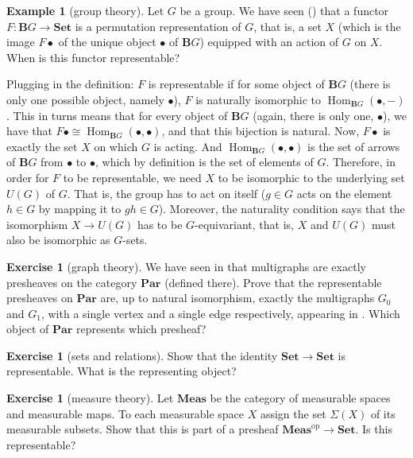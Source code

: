 \documentclass[12pt,oneside,headings=small]{scrbook}
\numberwithin{equation}{section}
\theoremstyle{plain}
\theoremstyle{definition}
\newtheorem{eg}[thm]{Example}
\newtheorem{ex}[thm]{Exercise}
\DeclareMathOperator{\Hom}{Hom}
\newcommand{\cat}[1]{{\mathbf{#1}}} %
\newcommand{\op}{\mathrm{op}} %
\newcommand{\Set}{\cat{Set}}
\DeclareMathOperator{\1}{\mathbbm{1}}
\DeclareMathOperator{\2}{\mathbbm{2}}
\begin{document}
\begin{eg}[group theory]\label{BGrepr}
 Let $G$ be a group. We have seen () that a functor $F:\cat{B}G\to\Set$ is a permutation representation of $G$, that is, a set $X$ (which is the image $F\bullet$ of the unique object $\bullet$ of $\cat{B}G$) equipped with an action of $G$ on $X$. When is this functor representable?
 
 Plugging in the definition: $F$ is representable if for some object of $\cat{B}G$ (there is only one possible object, namely $\bullet$), $F$ is naturally isomorphic to $\Hom_{\cat{B}G}(\bullet, -)$. This in turns means that for every object of $\cat{B}G$ (again, there is only one, $\bullet$), we have that $F\bullet \cong \Hom_{\cat{B}G}(\bullet, \bullet)$, and that this bijection is natural. Now, $F\bullet$ is exactly the set $X$ on which $G$ is acting. And $\Hom_{\cat{B}G}(\bullet, \bullet)$ is the set of arrows of $\cat{B}G$ from $\bullet$ to $\bullet$, which by definition is the set of elements of $G$. Therefore, in order for $F$ to be representable, we need $X$ to be isomorphic to the underlying set $U(G)$ of $G$. That is, the group has to act on itself ($g\in G$ acts on the element $h\in G$ by mapping it to $gh\in G$). Moreover, the naturality condition says that the isomorphism $X\to U(G)$ has to be $G$-equivariant, that is, $X$ and $U(G)$ must also be isomorphic as $G$-sets. 
\end{eg}

\begin{ex}[graph theory]
 We have seen in  that multigraphs are exactly presheaves on the category $\cat{Par}$ (defined there). 
 Prove that the representable presheaves on $\cat{Par}$ are, up to natural isomorphism, exactly the multigraphs $G_0$ and $G_1$, with a single vertex and a single edge respectively, appearing in . Which object of $\cat{Par}$ represents which presheaf?
\end{ex}

\begin{ex}[sets and relations]
 Show that the identity $\Set\to\Set$ is representable. What is the representing object?
\end{ex}

\begin{ex}[measure theory]
 Let $\cat{Meas}$ be the category of measurable spaces and measurable maps. To each measurable space $X$ assign the set $\Sigma(X)$ of its measurable subsets. Show that this is part of a presheaf $\cat{Meas}^\op\to\Set$. Is this representable?
\end{ex}
\end{document}
